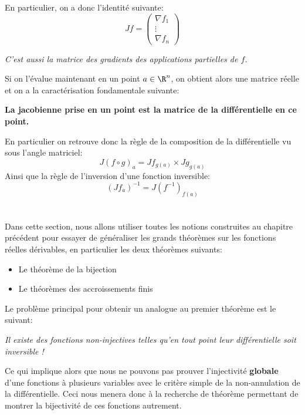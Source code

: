 En particulier, on a donc l'identité suivante:
\[
   Jf = \begin{pmatrix}
      \nabla f_1\\
      \vdots\\ 
      \nabla f_n
   \end{pmatrix}
\]
\begin{center}
   \textit{C'est aussi la matrice des gradients des applications partielles de \(f\).}
\end{center}
Si on l'évalue maintenant en un point \(a \in \R^n\), on obtient alors une matrice réelle et on a la caractérisation fondamentale suivante:
\begin{center}
   \textbf{La jacobienne prise en un point est la matrice de la différentielle en ce point.}
\end{center}
En particulier on retrouve donc la règle de la composition de la différentielle vu sous l'angle matriciel:
\[
   J(f \circ g)_a = Jf_{g(a)} \times Jg_{g(a)}
\]
Ainsi que la règle de l'inversion d'une fonction inversible:
\[
   (Jf_{a})^{-1} = J(f^{-1})_{f(a)}
\]

\chapter*{}

\chapter*{}
Dans cette section, nous allons utiliser toutes les notions construites au chapitre précédent pour essayer de généraliser les grands théorèmes sur les fonctions réelles dérivables, en particulier les deux théorèmes suivants:
\begin{itemize}
   \item Le théorème de la bijection
   \item Le théorèmes des accroissements finis
\end{itemize}
Le problème principal pour obtenir un analogue au premier théorème est le suivant:
\begin{center}
   \textit{Il existe des fonctions non-injectives telles qu'en tout point leur différentielle soit inversible !}
\end{center}
Ce qui implique alors que nous ne pouvons pas prouver l'injectivité \textbf{globale} d'une fonctions à plusieurs variables avec le critère simple de la non-annulation de la différentielle. Ceci nous menera donc à la recherche de théorème permettant de montrer la bijectivité de ces fonctions autrement.


